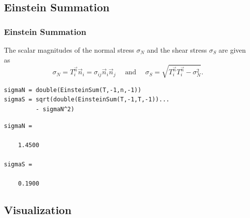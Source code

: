 \documentclass[compress]{beamer}
\begin{document}
\subsection*{Einstein Summation}

\begin{frame}[fragile]
  \frametitle{Einstein Summation}

  The scalar magnitudes of the normal stress $\sigma_{N}$ and the shear stress
  $\sigma_{S}$ are given as
  \begin{equation*}
    \sigma_{N} = T^{\vec n}_{i} \vec n_{i} = \sigma_{ij} \vec n_{i}\vec n_{j}
    \quad \text{ and } \quad
    \sigma_{S} =\sqrt{T^{\vec n}_{i}T^{\vec n}_{i} - \sigma^{2}_{N} }.
  \end{equation*}

  \medskip
  \pause

\begin{lstlisting}[style=input]
sigmaN = double(EinsteinSum(T,-1,n,-1))
sigmaS = sqrt(double(EinsteinSum(T,-1,T,-1))...
         - sigmaN^2)
\end{lstlisting}
\vspace{-.3cm}
\begin{lstlisting}[style=output]
sigmaN =

    1.4500

sigmaS =

    0.1900
\end{lstlisting}

\end{frame}

\subsection*{Visualization}
\end{document}

